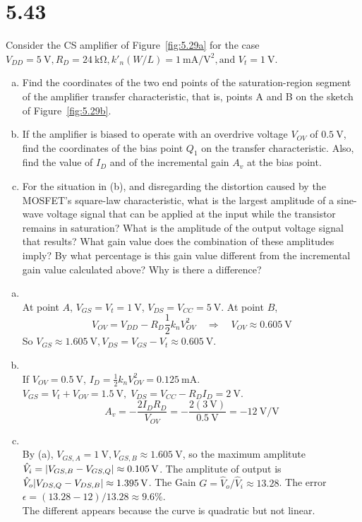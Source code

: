 \documentclass[12pt, a4paper]{article}
\begin{document}
\section{5.43}
Consider the CS amplifier of Figure~\ref{fig:5.29a} for the case $V_{DD} = \SI{5}{\V}, R_D = \SI{24}{\kohm}, k'_n(W/L) = \SI{1}{\mA\per\V\squared},\text{and } V_t = \SI{1}{\V}$.
\begin{enumerate}[(a)]
  \item Find the coordinates of the two end points of the saturation-region segment of the amplifier transfer characteristic, that is, points A and B on the sketch of Figure~\ref{fig:5.29b}.
  \item If the amplifier is biased to operate with an overdrive voltage $V_{OV}$ of $\SI{0.5}{\V}$, find the coordinates of the bias point $Q_1$ on the transfer characteristic. Also, find the value of $I_D$ and of the incremental gain $A_v$ at the bias point.
  \item For the situation in (b), and disregarding the distortion caused by the MOSFET's square-law characteristic, what is the largest amplitude of a sine-wave voltage signal that can be applied at the input while the transistor remains in saturation? What is the amplitude of the output voltage signal that results? What gain value does the combination of these amplitudes imply? By what percentage is this gain value different from the incremental gain value calculated above? Why is there a difference?
\end{enumerate}

\begin{enumerate}[(a)]
  \item \Ans \\
    At point $A$, $V_{GS} = V_t = \SI{1}{\V}$, $V_{DS} = V_{CC} = \SI{5}{\V}$. At point $B$, 
    \[ V_{OV} = V_{DD} - R_D \frac{1}{2} k_n V_{OV}^2 \quad \Rightarrow
    \quad V_{OV} \approx \SI{0.605}{\V} \]
    So $V_{GS} \approx \SI{1.605}{\V}, V_{DS} = V_{GS} - V_t \approx \SI{0.605}{\V}$.
  \item \Ans \\
    If $V_{OV} = \SI{0.5}{\V}$, $I_D = \frac{1}{2} k_n V_{OV}^2 = \SI{0.125}{\mA}$.$V_{GS} = V_t + V_{OV} = \SI{1.5}{\V}, \; V_{DS} = V_{CC} - R_D I_D = \SI{2}{\V}$.
    \[
    A_{v} = -\frac{2 I_D R_D}{V_{OV}} = -\frac{2 (\SI{3}{\V}) }{\SI{0.5}{\V}} =  -\SI{12}{\V\per\V} \]
  \item \Ans \\
    By (a), $V_{GS,A} = \SI{1}{\V}, V_{GS, B} \approx \SI{1.605}{\V}$, so the maximum amplitute $\hat{V}_i = \abs{V_{GS, B} - V_{GS, Q}} \approx \SI{0.105}{\V}$.
    The amplitute of output is $\hat{V}_o \abs{V_{DS, Q} - V_{DS, B}} \approx \SI{1.395}{\V}$. The Gain $G = \hat{V}_o / \hat{V}_i \approx 13.28$. The error $\epsilon = (13.28 - 12)/13.28  \approx 9.6\%$. \\
    The different appears because the curve is quadratic but not linear.
\end{enumerate}
\end{document}
